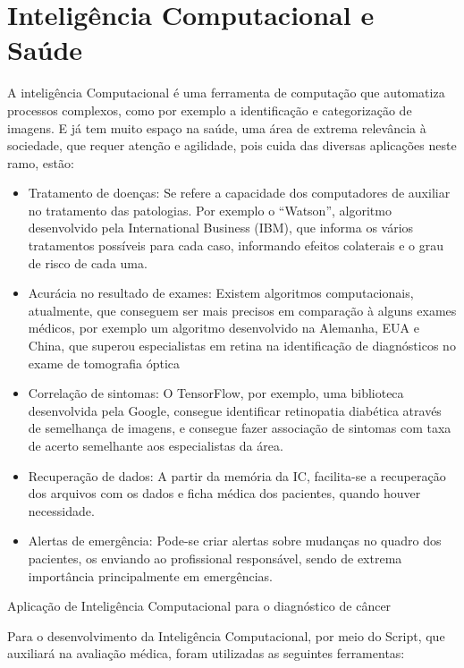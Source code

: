 \chapter{Inteligência Computacional e Saúde}
\label{chapter:inteligencia_computacional_e_saude}

A inteligência Computacional é uma ferramenta de computação que automatiza processos complexos, como por exemplo a identificação e categorização de imagens. E já tem muito espaço na saúde, uma área de extrema relevância à sociedade, que requer atenção e agilidade, pois cuida das diversas aplicações neste ramo, estão:
 
\begin{itemize}
\item Tratamento de doenças: Se refere a capacidade dos computadores de auxiliar no tratamento das patologias. Por exemplo o “Watson”, algoritmo desenvolvido pela International Business (IBM), que informa os vários tratamentos possíveis para cada caso, informando efeitos colaterais e o grau de risco de cada uma.

\item Acurácia no resultado de exames: Existem algoritmos computacionais, atualmente, que conseguem ser mais precisos em comparação à alguns exames médicos, por exemplo um algoritmo desenvolvido na Alemanha, EUA e China, que superou especialistas em retina na identificação de diagnósticos no exame de tomografia óptica

\item Correlação de sintomas: O TensorFlow, por exemplo, uma biblioteca desenvolvida pela Google, consegue identificar retinopatia diabética através de semelhança de imagens, e consegue fazer associação de sintomas com taxa de acerto semelhante aos especialistas da área.

\item Recuperação de dados: A partir da memória da IC, facilita-se a recuperação dos arquivos com os dados e ficha médica dos pacientes, quando houver necessidade.

\item Alertas de emergência: Pode-se criar alertas sobre mudanças no quadro dos pacientes, os enviando ao profissional responsável, sendo de extrema importância principalmente em emergências.
\end{itemize}

 Aplicação de Inteligência Computacional para o diagnóstico de câncer

Para o desenvolvimento da Inteligência Computacional, por meio do Script, que auxiliará na avaliação médica, foram utilizadas as seguintes ferramentas:

